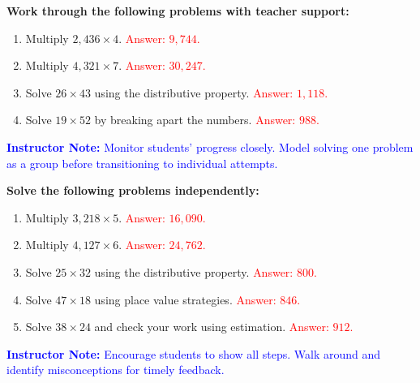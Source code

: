 \documentclass[12pt]{article}
\begin{document}
\vspace{1em}

\begin{tcolorbox}[colframe=black!60, colback=white, 
coltitle=black, colbacktitle=black!15, fonttitle=\bfseries\Large, 
title=Guided Practice, halign title=center, left=10pt, right=10pt, top=10pt, bottom=15pt]
\textbf{Work through the following problems with teacher support:}
\begin{enumerate}[itemsep=3em]
    \item Multiply \( 2,436 \times 4 \). \textcolor{red}{Answer: \( 9,744 \).}
    \item Multiply \( 4,321 \times 7 \). \textcolor{red}{Answer: \( 30,247 \).}
    \item Solve \( 26 \times 43 \) using the distributive property. \textcolor{red}{Answer: \( 1,118 \).}
    \item Solve \( 19 \times 52 \) by breaking apart the numbers. \textcolor{red}{Answer: \( 988 \).}
\end{enumerate}

\textcolor{blue}{\textbf{Instructor Note:} Monitor students’ progress closely. Model solving one problem as a group before transitioning to individual attempts.}
\end{tcolorbox}

\vspace{1em}

\begin{tcolorbox}[colframe=black!60, colback=white, 
coltitle=black, colbacktitle=black!15, fonttitle=\bfseries\Large, 
title=Independent Practice, halign title=center, left=10pt, right=10pt, top=10pt, bottom=15pt]
\textbf{Solve the following problems independently:}
\begin{enumerate}[itemsep=3em]
    \item Multiply \( 3,218 \times 5 \). \textcolor{red}{Answer: \( 16,090 \).}
    \item Multiply \( 4,127 \times 6 \). \textcolor{red}{Answer: \( 24,762 \).}
    \item Solve \( 25 \times 32 \) using the distributive property. \textcolor{red}{Answer: \( 800 \).}
    \item Solve \( 47 \times 18 \) using place value strategies. \textcolor{red}{Answer: \( 846 \).}
    \item Solve \( 38 \times 24 \) and check your work using estimation. \textcolor{red}{Answer: \( 912 \).}
\end{enumerate}

\textcolor{blue}{\textbf{Instructor Note:} Encourage students to show all steps. Walk around and identify misconceptions for timely feedback.}
\end{tcolorbox}
\end{document}
